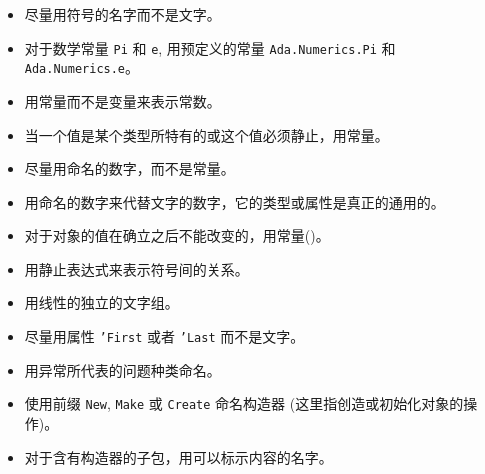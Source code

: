 \begin{itemize}
    \item 尽量用符号的名字而不是文字。
    \item 对于数学常量 \texttt{Pi} 和 \texttt{e},
用预定义的常量 \texttt{Ada.Numerics.Pi} 和 \texttt{Ada.Numerics.e}。
    \item 用常量而不是变量来表示常数。
    \item 当一个值是某个类型所特有的或这个值必须静止，用常量。
    \item 尽量用命名的数字，而不是常量。
    \item 用命名的数字来代替文字的数字，它的类型或属性是真正的通用的。
    \item 对于对象的值在确立之后不能改变的，用常量(\cite{united87})。
    \item 用静止表达式来表示符号间的关系。
    \item 用线性的独立的文字组。
    \item 尽量用属性 \texttt{'First} 或者 \texttt{'Last} 而不是文字。
    \item 用异常所代表的问题种类命名。
    \item 使用前缀 \texttt{New}, \texttt{Make} 或 \texttt{Create}
命名构造器 (这里指创造或初始化对象的操作)。
    \item 对于含有构造器的子包，用可以标示内容的名字。
\end{itemize}

